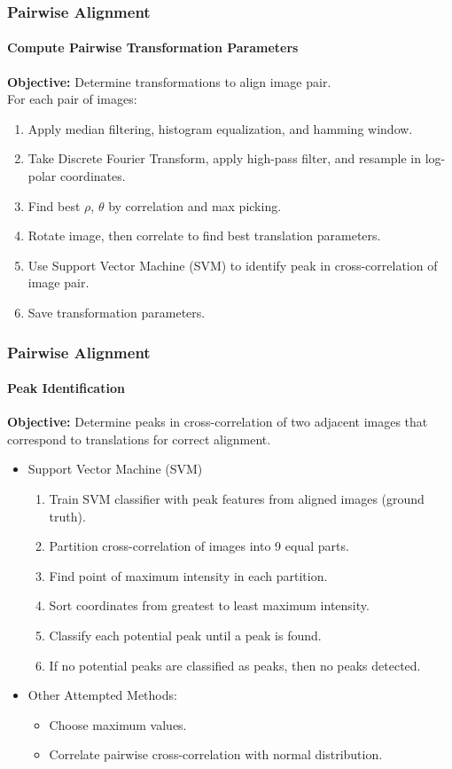 \documentclass{beamer}
\begin{document}
\begin{frame}
\frametitle{Pairwise Alignment}
\framesubtitle{Compute Pairwise Transformation Parameters}
\textbf{Objective:} Determine transformations to align image pair. \\
For each pair of images:
\begin{enumerate}
\item Apply median filtering, histogram equalization, and hamming window. 
\item Take Discrete Fourier Transform, apply high-pass filter, and resample in log-polar coordinates. 
\item Find best $\rho$, $\theta$ by correlation and max picking. 
\item Rotate image, then correlate to find best translation parameters.
\item Use Support Vector Machine (SVM) to identify peak in cross-correlation of image pair. 
\item Save transformation parameters.
\end{enumerate}
\end{frame}

\begin{frame}
\frametitle{Pairwise Alignment}
\framesubtitle{Peak Identification}
\textbf{Objective:} Determine peaks in cross-correlation of two adjacent images that correspond to translations for correct alignment. \\
\begin{itemize}
\item Support Vector Machine (SVM)
\begin{enumerate}
\item Train SVM classifier with peak features from aligned images (ground truth).
\item Partition cross-correlation of images into 9 equal parts.
\item Find point of maximum intensity in each partition.
\item Sort coordinates from greatest to least maximum intensity.
\item Classify each potential peak until a peak is found.
\item If no potential peaks are classified as peaks, then no peaks detected.
\end{enumerate}
\item Other Attempted Methods:
\begin{itemize}
\item Choose maximum values. 
\item Correlate pairwise cross-correlation with normal distribution. 
\end{itemize}
\end{itemize}
\end{frame}
\end{document}
